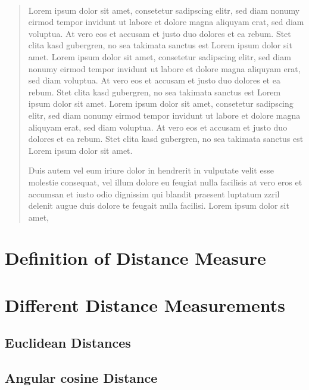 \documentclass[12pt]%
{article}
\begin{document}
\newpage\thispagestyle{empty}~ %
\newpage 

\begin{abstract}
Lorem ipsum dolor sit amet, consetetur sadipscing elitr, sed diam nonumy eirmod tempor invidunt ut labore et dolore magna aliquyam erat, sed diam voluptua. At vero eos et accusam et justo duo dolores et ea rebum. Stet clita kasd gubergren, no sea takimata sanctus est Lorem ipsum dolor sit amet. Lorem ipsum dolor sit amet, consetetur sadipscing elitr, sed diam nonumy eirmod tempor invidunt ut labore et dolore magna aliquyam erat, sed diam voluptua. At vero eos et accusam et justo duo dolores et ea rebum. Stet clita kasd gubergren, no sea takimata sanctus est Lorem ipsum dolor sit amet. Lorem ipsum dolor sit amet, consetetur sadipscing elitr, sed diam nonumy eirmod tempor invidunt ut labore et dolore magna aliquyam erat, sed diam voluptua. At vero eos et accusam et justo duo dolores et ea rebum. Stet clita kasd gubergren, no sea takimata sanctus est Lorem ipsum dolor sit amet.   

Duis autem vel eum iriure dolor in hendrerit in vulputate velit esse molestie consequat, vel illum dolore eu feugiat nulla facilisis at vero eros et accumsan et iusto odio dignissim qui blandit praesent luptatum zzril delenit augue duis dolore te feugait nulla facilisi. Lorem ipsum dolor sit amet,
\end{abstract}

\newpage

\tableofcontents

\newpage


\section{Definition of Distance Measure}
\label{def_DM}

\section{Different Distance Measurements}

\subsection{Euclidean Distances}


\subsection{Angular cosine Distance}

\end{document}
